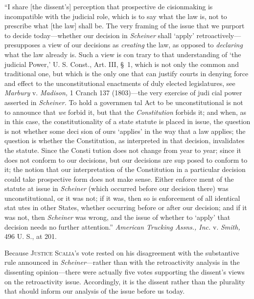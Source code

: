 {{{{      ``I share [the dissent's] perception that prospective de
    cisionmaking is incompatible with the judicial role, which is to
    say what the law is, not to prescribe what [the law] shall be.
    The very framing of the issue that \newpage  we purport to decide
    today---whether our decision in \emph{Scheiner} shall ‘apply'
    retroactively---presupposes a view of our decisions as \emph{creating}
    the law, as opposed to \emph{declaring} what the law already is.
    Such a view is con trary to that understanding of ‘the judicial
    Power,' U. S. Const., Art. III, \S~1, which is not only the
    common and traditional one, but which is the only one that can
    justify courts in denying force and effect to the unconstitutional
    enactments of duly elected legislatures, see \emph{Marbury} v.
    \emph{Madison,} 1 Cranch 137 (1803)---the very exercise of judi cial
    power asserted in \emph{Scheiner.} To hold a governmen tal Act to be
    unconstitutional is not to announce that \emph{we} forbid it, but
    that the \emph{Constitution} forbids it; and when, as in this case,
    the constitutionality of a state statute is placed in issue, the
    question is not whether some deci sion of ours ‘applies' in the
    way that a law applies; the question is whether the Constitution,
    as interpreted in that decision, invalidates the statute. Since the
    Consti tution does not change from year to year; since it does not
    conform to our decisions, but our decisions are sup posed to conform
    to it; the notion that our interpretation of the Constitution in a
    particular decision could take prospective form does not make sense.
    Either enforce ment of the statute at issue in \emph{Scheiner} (which
    occurred before our decision there) was unconstitutional, or it was
    not; if it was, then so is enforcement of all identical stat utes
    in other States, whether occurring before or after our decision;
    and if it was not, then \emph{Scheiner} was wrong, and the issue of
    whether to ‘apply' that decision needs no further attention.''
    \emph{American Trucking Assns., Inc.} v. \emph{Smith,} 496 U. S., at
    201.

\noindent Because \textsc{Justice Scalia}'s vote rested on his disagreement with
the substantive rule announced in \emph{Scheiner}---rather than with
the retroactivity analysis in the dissenting opin\newpage ion---there
were actually five votes supporting the dissent's views on the
retroactivity issue. Accordingly, it is the dissent rather than the
plurality that should inform our analysis of the issue before us
today.\footnotemark[22]

}}}}
